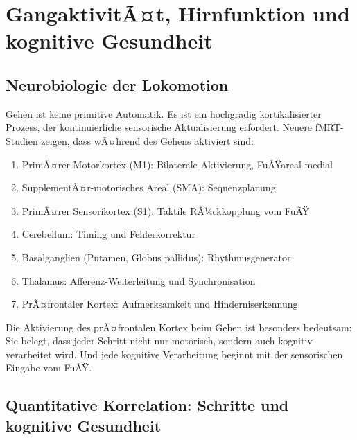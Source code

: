 ﻿\documentclass[12pt,a4paper]{report}
\theoremstyle{plain}
\theoremstyle{definition}
\theoremstyle{remark}
\begin{document}
\chapter{GangaktivitÃ¤t, Hirnfunktion und kognitive Gesundheit}

\section{Neurobiologie der Lokomotion}

Gehen ist keine primitive Automatik. Es ist ein hochgradig kortikalisierter
Prozess, der kontinuierliche sensorische Aktualisierung erfordert. Neuere
fMRT-Studien \cite{la_fougere2010, zwergal2012} zeigen, dass wÃ¤hrend des
Gehens aktiviert sind:

\begin{enumerate}
\item PrimÃ¤rer Motorkortex (M1): Bilaterale Aktivierung, FuÃŸareal medial
\item SupplementÃ¤r-motorisches Areal (SMA): Sequenzplanung
\item PrimÃ¤rer Sensorikortex (S1): Taktile RÃ¼ckkopplung vom FuÃŸ
\item Cerebellum: Timing und Fehlerkorrektur
\item Basalganglien (Putamen, Globus pallidus): Rhythmusgenerator
\item Thalamus: Afferenz-Weiterleitung und Synchronisation
\item PrÃ¤frontaler Kortex: Aufmerksamkeit und Hinderniserkennung
\end{enumerate}

Die Aktivierung des prÃ¤frontalen Kortex beim Gehen ist besonders bedeutsam:
Sie belegt, dass jeder Schritt nicht nur motorisch, sondern auch kognitiv
verarbeitet wird. Und jede kognitive Verarbeitung beginnt mit der sensorischen
Eingabe vom FuÃŸ.

\section{Quantitative Korrelation: Schritte und kognitive Gesundheit}
\end{document}
